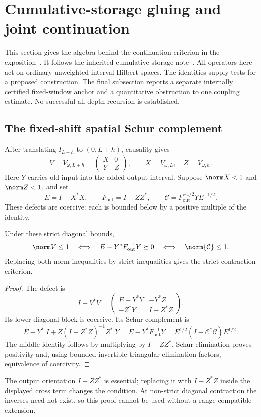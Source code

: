 \section{Cumulative-storage gluing and joint continuation}\label{sec:continuation}

This section gives the algebra behind the continuation criterion in
the exposition~\cite{Exposition}. It follows the inherited
cumulative-storage note~\cite{CumulativePath}. All operators here
act on ordinary unweighted interval Hilbert spaces. The identities
supply tests for a proposed construction. The final subsection reports
a separate internally certified fixed-window anchor and a quantitative
obstruction to one coupling estimate. No successful all-depth recursion
is established.

\subsection{The fixed-shift spatial Schur complement}

After translating $I_{L+h}$ to $(0,L+h)$, causality gives
\begin{equation}\label{eq:si-block}
 V=V_{\omega,L+h}=
 \begin{pmatrix}X&0\\Y&Z\end{pmatrix},
 \qquad X=V_{\omega,L},\quad Z=V_{\omega,h}.
\end{equation}
Here $Y$ carries old input into the added output interval.
Suppose $\norm X<1$ and $\norm Z<1$, and set
\[
 E=I-X^*X,\qquad F_{\mathrm{out}}=I-ZZ^*,
 \qquad \mathcal C=F_{\mathrm{out}}^{-1/2}YE^{-1/2}.
\]
These defects are coercive: each is bounded below by a positive
multiple of the identity.

\begin{proposition}\label{prop:si-gluing}
Under these strict diagonal bounds,
\begin{equation}\label{eq:si-gluing}
 \norm V\leq1
 \quad\Longleftrightarrow\quad
 E-Y^*F_{\mathrm{out}}^{-1}Y\succeq0
 \quad\Longleftrightarrow\quad\norm{\mathcal C}\leq1.
\end{equation}
Replacing both norm inequalities by strict inequalities gives
the strict-contraction criterion.
\end{proposition}
\begin{proof}
The defect is
\[
 I-V^*V=
 \begin{pmatrix}
 E-Y^*Y&-Y^*Z\\
 -Z^*Y&I-Z^*Z
 \end{pmatrix}.
\]
Its lower diagonal block is coercive. Its Schur complement is
\[
 E-Y^*\bigl[I+Z(I-Z^*Z)^{-1}Z^*\bigr]Y
 =E-Y^*F_{\mathrm{out}}^{-1}Y
 =E^{1/2}(I-\mathcal C^*\mathcal C)E^{1/2}.
\]
The middle identity follows by multiplying by $I-ZZ^*$.
Schur elimination proves positivity and, using bounded invertible
triangular elimination factors, equivalence of coercivity.
\end{proof}
The output orientation $I-ZZ^*$ is essential; replacing it with
$I-Z^*Z$ inside the displayed cross term changes the condition.
At non-strict diagonal contraction the inverses need not exist,
so this proof cannot be used without a range-compatible extension.

